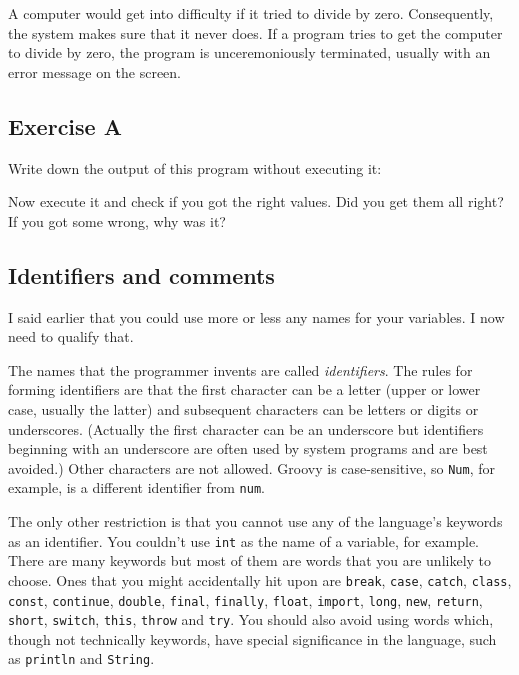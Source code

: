 
A computer would get into difficulty if it tried to divide by zero.
Consequently, the system makes sure that it never does.
If a program tries to get the computer to divide by zero, the program
is unceremoniously terminated, usually with an error message on the
screen.

\subsection*{Exercise A}

Write down the output of this program without executing it:


Now execute it and check if you got the right values. Did you get them
all right? If you got some wrong, why was it?


\subsection{Identifiers and comments}

I said earlier that you could use more or less any names for your variables.
I now need to qualify that.

The names that the programmer invents are called \emph{identifiers}.  The
rules for forming identifiers are that the first character can be a letter
(upper or lower case, usually the latter) and subsequent characters
can be letters or digits 
or underscores.  (Actually the first character can be an underscore but
identifiers beginning with an underscore are often used by system programs
and are best avoided.)  Other characters are not allowed.  Groovy is
case-sensitive, so \verb!Num!, for example, is a different identifier from
 \verb!num!.

The only other restriction is that you cannot use any of the language's keywords
as an identifier.  You couldn't use \verb!int! as the name of a variable,
for example. There are many keywords but most of them are words that you
are unlikely to choose. 
Ones that you might accidentally hit upon are \texttt{break},
\texttt{case}, \texttt{catch}, \texttt{class}, \texttt{const},
\texttt{continue}, \texttt{double}, \texttt{final}, \texttt{finally},
\texttt{float}, \texttt{import}, \texttt{long}, \texttt{new},
\texttt{return}, \texttt{short}, \texttt{switch}, \texttt{this},
\texttt{throw}  and \texttt{try}. You should also avoid 
using words which, though not technically keywords, have special significance
in the language, such as \verb!println! and \verb!String!.

